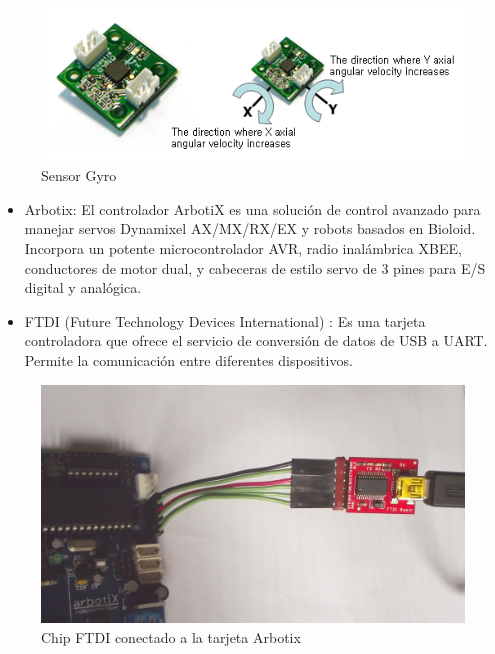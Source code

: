 \begin{figure}[hbtp]
\centering
\includegraphics[scale=0.5]{imagenes/gyro.png}
\caption{Sensor Gyro }
\end{figure}

\begin{itemize}
\item Arbotix: El controlador ArbotiX es una solución de control avanzado para manejar servos Dynamixel AX/MX/RX/EX y robots basados en Bioloid. Incorpora un potente microcontrolador AVR, radio inalámbrica XBEE, conductores de motor dual, y cabeceras de estilo servo de 3 pines para E/S digital y analógica.\cite{arbotix}

\end{itemize}


\begin{itemize}
\item FTDI (Future Technology Devices International) : Es una tarjeta controladora que ofrece el servicio de conversión de datos de USB a UART. Permite la comunicación entre diferentes dispositivos. 


\end{itemize}
\begin{figure}[hbtp]

\centering
\includegraphics[scale=0.09]{imagenes/DSCF1162.jpg}
\caption{Chip FTDI conectado a la tarjeta Arbotix }
\end{figure}



